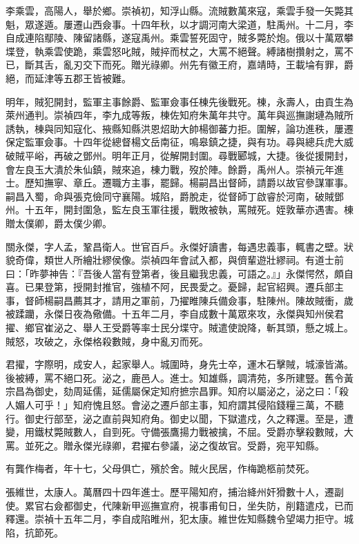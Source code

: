 \begin{pinyinscope}
李乘雲，高陽人，舉於鄉。崇禎初，知浮山縣。流賊數萬來寇，乘雲手發一矢斃其魁，眾遂遁。屢遷山西僉事。十四年秋，以才調河南大梁道，駐禹州。十二月，李自成連陷鄢陵、陳留諸縣，遂寇禹州。乘雲誓死固守，賊多斃於炮。俄以十萬眾攀堞登，執乘雲使跪，乘雲怒叱賊，賊捽而杖之，大罵不絕聲。縛諸樹攢射之，罵不已，斷其舌，亂刃交下而死。贈光祿卿。州先有徽王府，嘉靖時，王載埨有罪，爵絕，而延津等五郡王皆被難。

明年，賊犯開封，監軍主事餘爵、監軍僉事任棟先後戰死。棟，永壽人，由貢生為萊州通判。崇禎四年，李九成等叛，棟佐知府朱萬年共守。萬年與巡撫謝璉為賊所誘執，棟與同知寇化、掖縣知縣洪恩炤助大帥楊御蕃力拒。圍解，論功進秩，屢遷保定監軍僉事。十四年從總督楊文岳南征，鳴皋鎮之捷，與有功。尋與總兵虎大威破賊平峪，再破之鄧州。明年正月，從解開封圍。尋戰郾城，大捷。後從援開封，會左良玉大潰於朱仙鎮，賊來追，棟力戰，歿於陣。餘爵，禹州人。崇禎元年進士。歷知撫寧、章丘。遷職方主事，罷歸。楊嗣昌出督師，請爵以故官參謀軍事。嗣昌入蜀，命與張克儉同守襄陽。城陷，爵脫走，從督師丁啟睿於河南，破賊鄧州。十五年，開封圍急，監左良玉軍往援，戰敗被執，罵賊死。姪敦華亦遇害。棟贈太僕卿，爵太僕少卿。

關永傑，字人孟，鞏昌衛人。世官百戶。永傑好讀書，每遇忠義事，輒書之壁。狀貌奇偉，類世人所繪壯繆侯像。崇禎四年會試入都，與儕輩遊壯繆祠。有道士前曰：「昨夢神告：『吾後人當有登第者，後且繼我忠義，可語之。』」永傑愕然，頗自喜。已果登第，授開封推官，強植不阿，民畏愛之。憂歸，起官紹興。遷兵部主事，督師楊嗣昌薦其才，請用之軍前，乃擢睢陳兵備僉事，駐陳州。陳故賊衝，歲被蹂躪，永傑日夜為儆備。十五年二月，李自成數十萬眾來攻，永傑與知州侯君擢、鄉官崔泌之、舉人王受爵等率士民分堞守。賊遣使說降，斬其頭，懸之城上。賊怒，攻破之，永傑格殺數賊，身中亂刃而死。

君擢，字際明，成安人，起家舉人。城圍時，身先士卒，運木石擊賊，城濠皆滿。後被縛，罵不絕口死。泌之，鹿邑人。進士。知雄縣，調清苑，多所建豎。舊令黃宗昌為御史，劾周延儒，延儒屬保定知府摭宗昌罪。知府以屬泌之，泌之曰：「殺人媚人可乎！」知府愧且怒。會泌之遷戶部主事，知府謂其侵陷錢糧三萬，不聽行。御史行部至，泌之直前與知府角。御史以聞，下獄遣戍，久之釋還。至是，遭變，用鐵杖斃賊數人，自剄死。守備張鷹揚力戰被擒，不屈。受爵亦擊殺數賊，大罵。並死之。贈永傑光祿卿，君擢右參議，泌之復故官。受爵，宛平知縣。

有龔作梅者，年十七，父母俱亡，殯於舍。賊火民居，作梅跪柩前焚死。

張維世，太康人。萬曆四十四年進士。歷平陽知府，捕治絳州奸猾數十人，遷副使。累官右僉都御史，代陳新甲巡撫宣府，視事甫旬日，坐失防，削籍遣戍，已而釋還。崇禎十五年二月，李自成陷睢州，犯太康。維世佐知縣魏令望竭力拒守。城陷，抗節死。


\end{pinyinscope}
